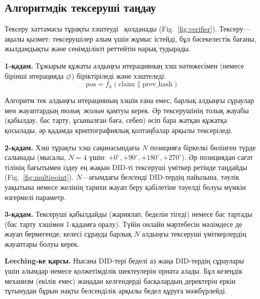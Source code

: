 \documentclass[11pt,a4paper,twocolumn]{article}
\begin{document}
\subsection{Алгоритмдік тексеруші таңдау}

Тексеру хаттамасы тұрақты хэштеуді~\cite{karger1997} қолданады (Fig.~\ref{fig:verifier}). Тексеру---ақылы қызмет: тексерушілер алым үшін жұмыс істейді, бұл бәсекелестік бағаны, жылдамдықты және сенімділікті реттейтін нарық тудырады.

\textbf{1-қадам.} Тұжырым құжаты алдыңғы итерацияның хэш нәтижесімен (немесе бірінші итерацияда $\varnothing$) біріктіріледі және хэштеледі:
\begin{equation}
\text{pos} = f_h(\text{claim} \| \text{prev\_hash})
\label{eq:hash}
\end{equation}

Алгоритм тек алдыңғы итерацияның хэшін ғана емес, барлық алдыңғы сұраулар мен жауаптардың \emph{толық жолын} қамтуы керек. Әр тексерушінің толық жауабы (қабылдау, бас тарту, ұсынылған баға, себеп) өсіп бара жатқан құжатқа қосылады, әр қадамда криптографиялық қолтаңбалар арқылы тексеріледі.

\textbf{2-қадам.} Хэш тұрақты хэш сақинасындағы $N$ позицияға біркелкі бөлінген түрде салынады (мысалы, $N=4$ үшін: $+0^{\circ}, +90^{\circ}, +180^{\circ}, +270^{\circ}$). Әр позициядан сағат тілінің бағытымен іздеу ең жақын DID-ті тексеруші үміткер ретінде таңдайды (Fig.~\ref{fig:multipoint}). $N$---ағымдағы белсенді DID-тердің пайызына, тәулік уақытына немесе желінің тарихи жауап беру қабілетіне тәуелді болуы мүмкін өзгермелі параметр.

\textbf{3-қадам.} Тексеруші қабылдайды (жариялап, беделін тігеді) немесе бас тартады (бас тарту хэшімен 1-қадамға оралу). Түйін онлайн мәртебесін мәлімдесе де жауап бермегенде, келесі сұрауда барлық $N$ алдыңғы тексеруші үміткерлердің жауаптары болуы керек.

\textbf{Leeching-ке қарсы.} Нысана DID-тері беделі аз жаңа DID-тердің сұраулары үшін алымдар немесе қолжетімділік шектеулерін орната алады. Бұл кезеңдік механизм (екілік емес) жаңадан келгендерді басқалардың деректерін еркін тұтынудан бұрын нақты белсенділік арқылы бедел құруға мәжбүрлейді.
\end{document}
